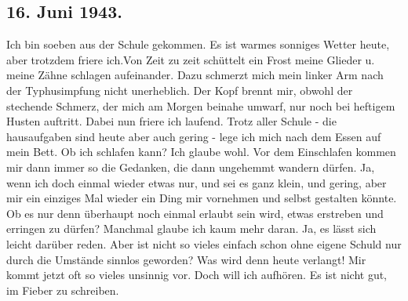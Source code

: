 \subsection{16. Juni 1943.}

Ich bin soeben aus der Schule gekommen.
Es ist warmes sonniges Wetter heute, aber trotzdem friere ich.Von Zeit zu zeit sch\"{u}ttelt ein Frost meine Glieder u. meine Z\"{a}hne schlagen aufeinander.
Dazu schmerzt mich mein linker Arm nach der Typhusimpfung nicht unerheblich.
Der Kopf brennt mir, obwohl der stechende Schmerz, der mich am Morgen beinahe umwarf, nur noch bei heftigem Husten auftritt.
Dabei nun friere ich laufend.
Trotz aller Schule - die hausaufgaben sind heute aber auch gering - lege ich mich nach dem Essen auf mein Bett.
Ob ich schlafen kann?
Ich glaube wohl.
Vor dem Einschlafen kommen mir dann immer so die Gedanken, die dann ungehemmt wandern d\"{u}rfen.
Ja, wenn ich doch einmal wieder etwas nur, und sei es ganz klein, und gering, aber mir ein einziges Mal wieder ein Ding mir vornehmen und selbst gestalten k\"{o}nnte.
Ob es nur denn \"{u}berhaupt noch einmal erlaubt sein wird, etwas erstreben und erringen zu d\"{u}rfen?
Manchmal glaube ich kaum mehr daran.
Ja, es l\"{a}sst sich leicht dar\"{u}ber reden.
Aber ist nicht so vieles einfach schon ohne eigene Schuld nur durch die Umst\"{a}nde sinnlos geworden?
Was wird denn heute verlangt!
Mir kommt jetzt oft so vieles unsinnig vor.
Doch will ich aufh\"{o}ren.
Es ist nicht gut, im Fieber zu schreiben.

\clearpage
